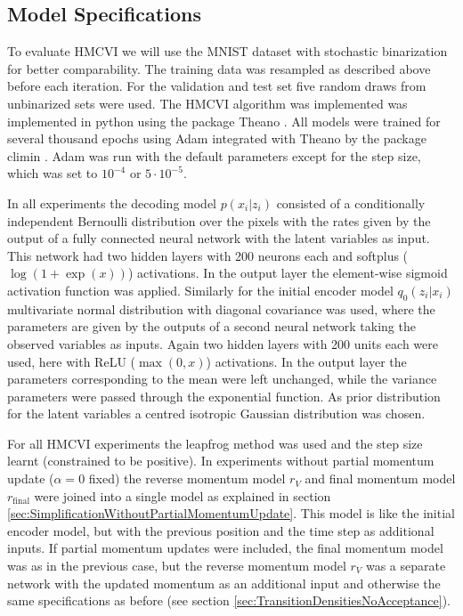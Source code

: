 \subsection{Model Specifications}
\label{sec:ModelSpecifications}
To evaluate HMCVI we will use the MNIST dataset with stochastic binarization for better comparability. The training data was resampled as described above before each iteration. For the validation and test set five random draws from unbinarized sets were used. The HMCVI algorithm was implemented was implemented in python using the package Theano \parencite{Bergstra2010, Bastien2012}. All models were trained for several thousand epochs using Adam \parencite{Kingma2015} integrated with Theano by the package climin \parencite{Bayer2015}. Adam was run with the default parameters except for the step size, which was set to $10^{-4}$ or $5 \cdot 10^{-5}$.

In all experiments the decoding model $p(x_i|z_i)$ consisted of a conditionally independent Bernoulli distribution over the pixels with the rates given by the output of a fully connected neural network with the latent variables as input. This network had two hidden layers with 200 neurons each and softplus ($\log(1 + \exp(x))$) activations. In the output layer the element-wise sigmoid activation function was applied. Similarly for the initial encoder model $q_0(z_i|x_i)$ multivariate normal distribution with diagonal covariance was used, where the parameters are given by the outputs of a second neural network taking the observed variables as inputs. Again two hidden layers with 200 units each were used, here with ReLU ($\max(0, x)$) activations. In the output layer the parameters corresponding to the mean were left unchanged, while the variance parameters were passed through the exponential function. As prior distribution for the latent variables a centred isotropic Gaussian distribution was chosen. 

For all HMCVI experiments the leapfrog method was used and the step size learnt (constrained to be positive). In experiments without partial momentum update ($\alpha = 0$ fixed) the reverse momentum model $r_V$ and final momentum model $r_\textrm{final}$ were joined into a single model as explained in section \ref{sec:SimplificationWithoutPartialMomentumUpdate}. This model is like the initial encoder model, but with the previous position and the time step as additional inputs. If partial momentum updates were included, the final momentum model was as in the previous case, but the reverse momentum model $r_V$ was a separate network with the updated momentum as an additional input and otherwise the same specifications as before (see section \ref{sec:TransitionDensitiesNoAcceptance}).

